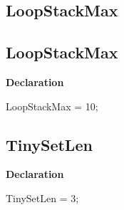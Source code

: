 \documentclass{report}
\newif\ifpdf
\begin{document}
\subsection*{\large{\textbf{LoopStackMax}}\normalsize\hspace{1ex}\hrulefill}
\else
\subsection*{LoopStackMax}
\fi
\label{RegExpr-LoopStackMax}
\begin{list}{}{
\setlength{\itemindent}{0cm}
\setlength{\listparindent}{0cm}
\setlength{\leftmargin}{\evensidemargin}
\addtolength{\leftmargin}{\tmplength}
\settowidth{\labelsep}{X}
\addtolength{\leftmargin}{\labelsep}
\setlength{\labelwidth}{\tmplength}
}
\item[\textbf{Declaration}\hfill]
\ifpdf
\begin{flushleft}
\fi
\begin{ttfamily}
LoopStackMax = 10;\end{ttfamily}

\ifpdf
\end{flushleft}
\fi

\end{list}
\ifpdf
\subsection*{\large{\textbf{TinySetLen}}\normalsize\hspace{1ex}\hrulefill}
\else
\subsection*{TinySetLen}
\fi
\label{RegExpr-TinySetLen}
\begin{list}{}{
\setlength{\itemindent}{0cm}
\setlength{\listparindent}{0cm}
\setlength{\leftmargin}{\evensidemargin}
\addtolength{\leftmargin}{\tmplength}
\settowidth{\labelsep}{X}
\addtolength{\leftmargin}{\labelsep}
\setlength{\labelwidth}{\tmplength}
}
\item[\textbf{Declaration}\hfill]
\ifpdf
\begin{flushleft}
\fi
\begin{ttfamily}
TinySetLen = 3;\end{ttfamily}

\ifpdf
\end{flushleft}
\fi

\end{list}
\ifpdf
\end{document}
